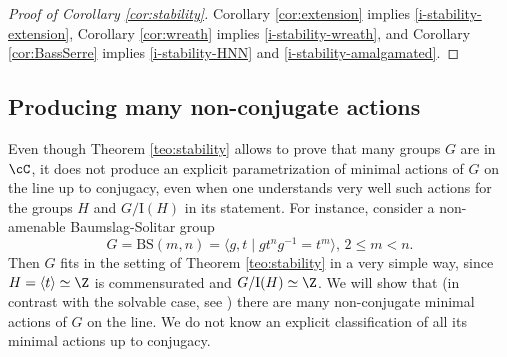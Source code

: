 \documentclass[reqno]{amsart}
\begin{document}
\begin{proof}[Proof of Corollary \ref{cor:stability}]
Corollary \ref{cor:extension} implies \eqref{i-stability-extension},  Corollary \ref{cor:wreath} implies  \eqref{i-stability-wreath}, and Corollary \ref{cor:BassSerre} implies \eqref{i-stability-HNN} and \eqref{i-stability-amalgamated}. \qedhere
\end{proof}
%

\subsection{Producing many non-conjugate actions} \label{subsection:BaumslagSolitar}
Even though Theorem \ref{teo:stability} allows to prove that many groups $G$ are in $\cC$,  it does not produce an explicit parametrization of  minimal  actions of $G$ on the line up to conjugacy, even when one understands very well such actions for the groups $H$ and $G/\mathrm{I}(H)$ in its statement. For instance, consider a non-amenable Baumslag-Solitar group
\[G = \mathrm{BS}(m,n) = \langle g,t \mid gt^ng^{-1} = t^m\rangle, \, 2 \leq m < n.\]
Then $G$  fits in the setting of Theorem \ref{teo:stability} in a very simple way, since $H=\langle t \rangle\simeq \Z$ is commensurated and $G/\mathrm{I}(H)\simeq \Z$. We will show that (in contrast with the solvable case, see \cite{Rivas2010}) there are many non-conjugate minimal actions of $G$ on the line. We do not know an explicit classification of all its  minimal actions up to conjugacy.
\end{document}
